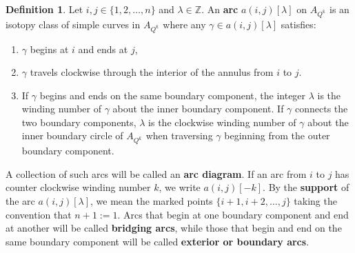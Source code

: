 \documentclass[12pt]{amsart}
\theoremstyle{plain}
\theoremstyle{definition}
\newtheorem{defn}{Definition}[section]
\theoremstyle{remark}
\begin{document}
\begin{defn}
Let $i,j\in\{1, 2, \dots , n\}$ and $\lambda \in \mathbb{Z}$. An \textbf{arc} $a(i,j)[\lambda]$ on $A_{Q^{\bm{\varepsilon}}}$ is an isotopy class of simple curves in $A_{Q^{\bm{\varepsilon}}}$ where any $\gamma \in a(i,j)[\lambda]$ satisfies: 
\begin{enumerate}
\item $\gamma$ begins at $i$ and ends at $j$, 
\item $\gamma$ travels clockwise through the interior of the annulus from $i$ to $j$. 
\item If $\gamma$ begins and ends on the same boundary component, the integer $\lambda$ is the winding number of $\gamma$ about the inner boundary component. If $\gamma$ connects the two boundary components, $\lambda$ is the clockwise winding number of $\gamma$ about the inner boundary circle of $A_{Q^{\bm{\varepsilon}}}$ when traversing $\gamma$ beginning from the outer boundary component. 
\end{enumerate}
  
A collection of such arcs will be called an \textbf{arc diagram}. If an arc from $i$ to $j$ has counter clockwise winding number $k$, we write $a(i,j)[-k]$. By the \textbf{support} of the arc $a(i,j)[\lambda]$, we mean the marked points $\{i+1, i+2, \dots, j\}$ taking the convention that $n+1 := 1$. Arcs that begin at one boundary component and end at another will be called \textbf{bridging arcs}, while those that begin and end on the same boundary component will be called \textbf{exterior or boundary arcs}.  

\end{defn}
\end{document}
